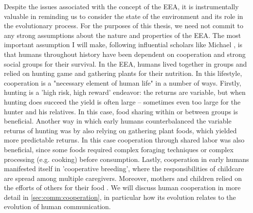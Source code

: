 Despite the issues associated with the concept of the EEA, it is instrumentally valuable in reminding us to consider the state of the environment and its role in the evolutionary process. For the purposes of this thesis, we need not commit to any strong assumptions about the nature and properties of the EEA. The most important assumption I will make, following influential scholars like Michael \citet{Tomasello09}, is that humans throughout history have been dependent on cooperation and strong social groups for their survival.
In the EEA, humans lived together in groups and relied on hunting game and gathering plants for their nutrition.
In this lifestyle, cooperation is a "necessary element of human life" \citep[p.~R448]{ApicellaSilk19} in a number of ways. Firstly, hunting is a 'high risk, high reward' endeavor: the returns are variable, but when hunting does succeed the yield is often large -- sometimes even too large for the hunter and his relatives. In this case, food sharing within or between groups is beneficial.
Another way in which early humans counterbalanced the variable returns of hunting was by also relying on gathering plant foods, which yielded more predictable returns. In this case cooperation through shared labor was also beneficial, since some foods required complex foraging techniques or complex processing (e.g. cooking) before consumption.
Lastly, cooperation in early humans manifested itself in 'cooperative breeding', where the responsibilities of childcare are spread among multiple caregivers. Moreover, mothers and children relied on the efforts of others for their food \citep{ApicellaSilk19}.
We will discuss human cooperation in more detail in \cref{sec:comm:cooperation}, in particular how its evolution relates to the evolution of human communication.

